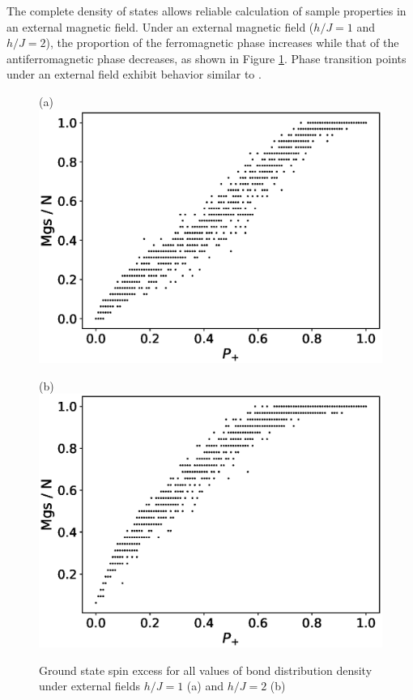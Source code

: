 \documentclass[utf8, babel, sor, jor, amsmath, amssymb, reprint]{elsarticle} %
\begin{document}
The complete density of states allows reliable calculation of sample properties in an external magnetic field. Under an external magnetic field ($h/J = 1$ and $h/J = 2$), the proportion of the ferromagnetic phase increases while that of the antiferromagnetic phase decreases, as shown in Figure \ref{fig:Mgs(P+)_H}. Phase transition points under an external field exhibit behavior similar to \cite{trukhin2024thermodynamic}.

\begin{figure}[H]
	\begin{minipage}[h]{0.45\linewidth}
		\centering (a)
		\includegraphics[width=1\linewidth]{images/Mgs(P+)_H1.eps}
	\end{minipage}
	\hfill
	\begin{minipage}[h]{0.45\linewidth}
		\centering (b)
		\includegraphics[width=1\linewidth]{images/Mgs(P+)_H2.eps}
	\end{minipage}
	\caption{Ground state spin excess for all values of bond distribution density under external fields $h/J = 1$ (a) and $h/J = 2$ (b)}
	\label{fig:Mgs(P+)_H}
\end{figure}
\end{document}

